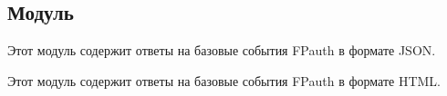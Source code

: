 \subsection{Модуль }\label{page-FPauth-responses-module-FPauth+u+responses}%
\label{page-FPauth-responses-module-FPauth+u+responses-module-JSON}\begin{ocamlindent}Этот модуль содержит ответы на базовые события FPauth в формате JSON.\end{ocamlindent}%
\medbreak
\label{page-FPauth-responses-module-FPauth+u+responses-module-HTML}\begin{ocamlindent}Этот модуль содержит ответы на базовые события FPauth в формате HTML.\end{ocamlindent}%
\medbreak

% 
% 
